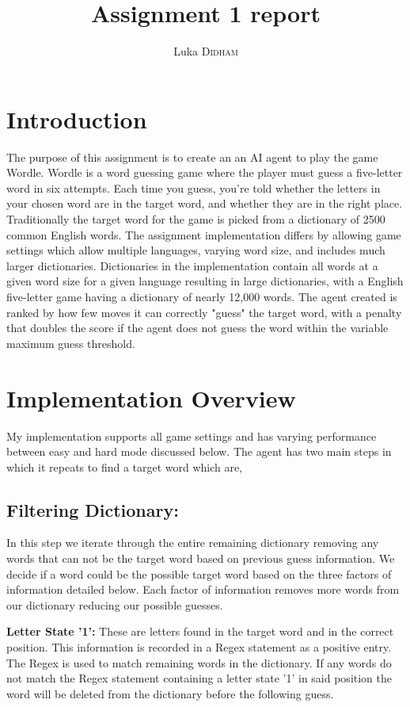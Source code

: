 \documentclass[12pt]{article}
\title{Assignment 1 report}
\author{Luka \textsc{Didham}}
\begin{document}
\maketitle


\section{Introduction}

The purpose of this assignment is to create an an AI agent to play the game Wordle. Wordle is a word guessing game where the player must guess a five-letter word in six attempts.
Each time you guess, you're told whether the letters in your chosen word are in the target word, and whether they are in the right place. Traditionally the target word for the game is picked from a
dictionary of 2500 common English words. The assignment implementation differs by allowing game settings which allow multiple languages, varying word size, and includes much larger dictionaries.
Dictionaries in the implementation contain all words at a given word size for a given language resulting in large dictionaries, with a English five-letter game having a dictionary of nearly 12,000 words.
The agent created is ranked by how few moves it can correctly "guess" the target word, with a penalty that doubles the score if the agent does not guess the word within the variable maximum guess threshold.

\section{Implementation Overview}

My implementation supports all game settings and has varying performance between easy and hard mode discussed below. The agent has two main steps in which it repeats to find a target word which are,

\subsection{Filtering Dictionary:}
In this step we iterate through the entire remaining dictionary removing any words that can not be the target word based on previous guess information. We decide if a word could be the possible target word based on the three factors of information detailed below. Each factor of information removes more words from our dictionary reducing our possible guesses.

\item \textbf{Letter State '1':} These are letters found in the target word and in the correct position. This information is recorded in a Regex statement as a positive entry. The Regex is used to match remaining words in the dictionary. If any words do not match the Regex statement containing a letter state '1' in said position the word will be deleted from the dictionary before the following guess.
\end{document}

